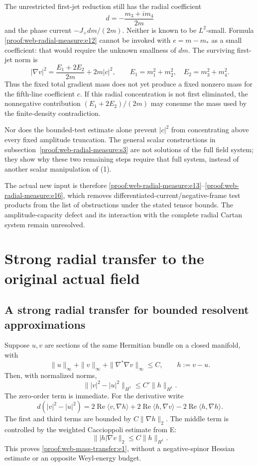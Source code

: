 The unrestricted first-jet reduction still has the radial coefficient \[
 d=-\frac{m_3+i m_4}{2m}
\] and the phase current \(-J_+dm/(2m)\). Neither is known to be \(L^2\)-small. Formula \eqref{proof:web-radial-measure:e12} cannot be invoked with \(e=m-m_*\) as a small coefficient: that would require the unknown smallness of \(dm\). The surviving first-jet norm is \[
 |\nabla v|^2=\frac{E_1+2E_2}{2m}+2m|c|^2,
 \qquad E_1=m_1^2+m_2^2,\quad E_2=m_3^2+m_4^2.
\] Thus the fixed total gradient mass does not yet produce a fixed nonzero mass for the fifth-line coefficient \(c\). If this radial concentration is not first eliminated, the nonnegative contribution \((E_1+2E_2)/(2m)\) may consume the mass used by the finite-density contradiction.

Nor does the bounded-test estimate alone prevent \(|c|^2\) from concentrating above every fixed amplitude truncation. The general scalar constructions in subsection~\ref{proof:web-radial-measure:s3} are not solutions of the full field system; they show why these two remaining steps require that full system, instead of another scalar manipulation of (1).

The actual new input is therefore \eqref{proof:web-radial-measure:e13}–\eqref{proof:web-radial-measure:e16}, which removes differentiated-current/negative-frame test products from the list of obstructions under the stated tensor bounds. The amplitude-capacity defect and its interaction with the complete radial Cartan system remain unresolved.


\section{Strong radial transfer to the original actual field}
\label{sec:web-mass-transfer}
\hypertarget{proof:web-mass-transfer:s1}{%
\subsection{A strong radial transfer for bounded resolvent approximations}\label{proof:web-mass-transfer:s1}}

Suppose \(u,v\) are sections of the same Hermitian bundle on a closed manifold, with \[
\|u\|_\infty+\|v\|_\infty+\|\nabla^*\nabla v\|_\infty\le C,
\qquad h:=v-u.
\] Then, with normalized norms, \[
\boxed{
\big\||v|^2-|u|^2\big\|_{H^1}\le C'\|h\|_{H^1}.
}
\tag{\thesection.1}\label{proof:web-mass-transfer:e1}
\] The zero-order term is immediate. For the derivative write \[
d(|v|^2-|u|^2)
=2\operatorname{Re}\langle v,\nabla h\rangle
 +2\operatorname{Re}\langle h,\nabla v\rangle
 -2\operatorname{Re}\langle h,\nabla h\rangle.
\] The first and third terms are bounded by \(C\|\nabla h\|_2\). The middle term is controlled by the weighted Caccioppoli estimate from E: \[
\||h|\nabla v\|_2\le C\|h\|_{H^1}.
\] This proves \eqref{proof:web-mass-transfer:e1}, without a negative-spinor Hessian estimate or an opposite Weyl-energy budget.

